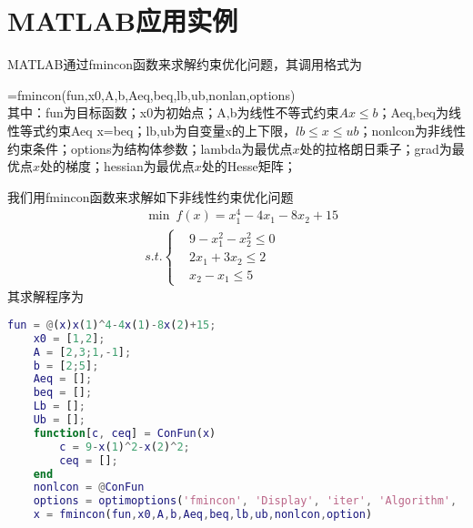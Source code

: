 \section{MATLAB应用实例}
    \par
    MATLAB通过fmincon函数来求解约束优化问题，其调用格式为
    \par
    [x,fval,exitflag,output,lambda,grad,hessian]=fmincon(fun,x0,A,b,Aeq,beq,lb,ub,nonlan,options)\\
    其中：fun为目标函数；x0为初始点；A,b为线性不等式约束$Ax \leqslant b$；Aeq,beq为线性等式约束Aeq x=beq；lb,ub为自变量x的上下限，$lb \leqslant x \leqslant ub$；nonlcon为非线性约束条件；options为结构体参数；lambda为最优点$x$处的拉格朗日乘子；grad为最优点$x$处的梯度；hessian为最优点$x$处的Hesse矩阵；
    \par
    我们用fmincon函数来求解如下非线性约束优化问题
    \begin{align*}
    &\mathop {\min}\  f(x)=x_1^4-4x_1-8x_2+15\\
    &s.t.\left\{
    \begin{aligned}
    &9-x_1^2-x_2^2 \leqslant 0\\
    &2x_1+3x_2 \leqslant 2\\
    &x_2-x_1 \leqslant 5
    \end{aligned}
    \right.
    \end{align*}
    其求解程序为
    \begin{lstlisting}[language=Matlab]
    fun = @(x)x(1)^4-4x(1)-8x(2)+15;
    x0 = [1,2];
    A = [2,3;1,-1];
    b = [2;5];
    Aeq = [];
    beq = [];
    Lb = [];
    Ub = [];
    function[c, ceq] = ConFun(x)
        c = 9-x(1)^2-x(2)^2;
        ceq = [];
    end
    nonlcon = @ConFun
    options = optimoptions('fmincon', 'Display', 'iter', 'Algorithm', 'sqp');
    x = fmincon(fun,x0,A,b,Aeq,beq,lb,ub,nonlcon,option)
    \end{lstlisting}











% 

